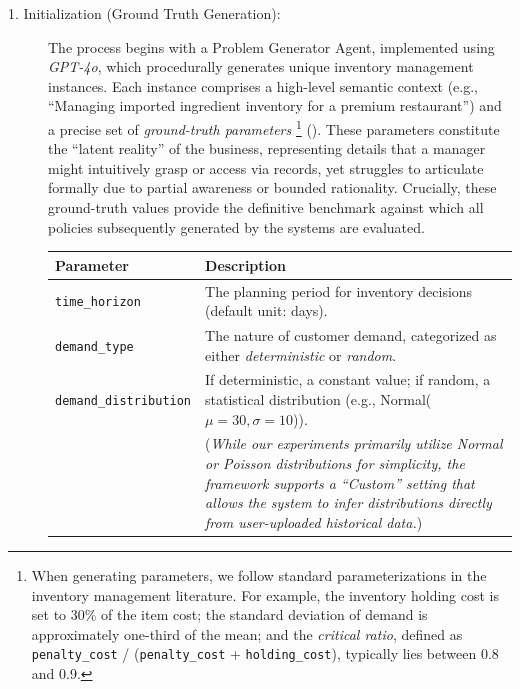 \begin{description}
    \item[1. Initialization (Ground Truth Generation):]
    The process begins with a {Problem Generator Agent}, implemented using \emph{GPT-4o}, which procedurally generates unique inventory management instances. Each instance comprises a high-level semantic context (e.g., ``Managing imported ingredient inventory for a premium restaurant'') and a precise set of \textit{ground-truth parameters} \footnote{When generating parameters, we follow standard parameterizations in the inventory management literature. For example, the inventory holding cost is set to 30\% of the item cost; the standard deviation of demand is approximately one-third of the mean; and the \emph{critical ratio}, defined as \texttt{penalty\_cost} / (\texttt{penalty\_cost} + \texttt{holding\_cost}), typically lies between 0.8 and 0.9.} (). These parameters constitute the ``latent reality'' of the business, representing details that a manager might intuitively grasp or access via records, yet struggles to articulate formally due to partial awareness or bounded rationality. Crucially, these ground-truth values provide the definitive benchmark against which all policies subsequently generated by the systems are evaluated.



    \begin{table}[!ht]
    \centering
    \renewcommand{\arraystretch}{1.2}
    \begin{tabular}{
        >{\raggedright\arraybackslash}p{}
        >{\raggedright\arraybackslash}p{}
    }
        \toprule
        \textbf{Parameter} & \textbf{Description} \\
        \midrule
        \texttt{time\_horizon} &
        The planning period for inventory decisions (default unit: days). \\

        \texttt{demand\_type} &
        The nature of customer demand, categorized as either \textit{deterministic} or \textit{random}. \\

        \texttt{demand\_distribution} &
        If deterministic, a constant value; if random, a statistical distribution (e.g., Normal($\mu=30, \sigma=10$)). \\
        & {\footnotesize (\emph{While our experiments primarily utilize Normal or Poisson distributions for simplicity, the framework supports a ``Custom'' setting that allows the system to infer distributions directly from user-uploaded historical data.})} \\


\end{tabular}
\end{table}
\end{description}
